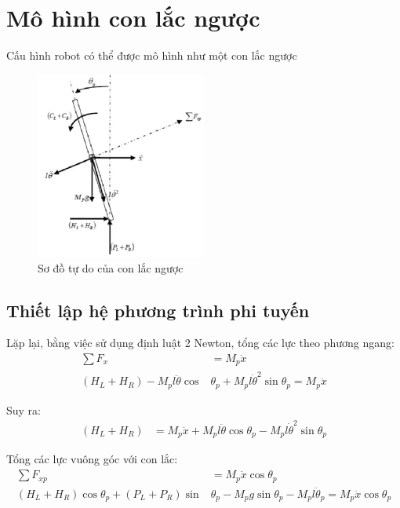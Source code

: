     \section{Mô hình con lắc ngược}
        \hspace*{0.6cm}Cấu hình robot có thể được mô hình như một con lắc ngược
            \begin{figure}[H]
                \centering
                \includegraphics[width=0.5\textwidth]{pictures/inverted_pendulum.png} 
                \caption{Sơ đồ tự do của con lắc ngược}
            \end{figure}
        \subsection{Thiết lập hệ phương trình phi tuyến}
            Lặp lại, bằng việc sử dụng định luật 2 Newton, tổng các lực theo phương ngang:
            \begin{align}
                \sum F_x &= M_p \ddot{x} \nonumber\\
                (H_L + H_R) - M_p l \ddot{\theta} \cos &\theta_p + M_p l \dot{\theta}^2 \sin \theta_p = M_p \ddot{x} 
            \end{align}
            
            Suy ra:
            \begin{align}
                (H_L + H_R) &= M_p \ddot{x} + M_p l \ddot{\theta} \cos \theta_p - M_p l \dot{\theta}^2 \sin \theta_p 
            \end{align}
            
            Tổng các lực vuông góc với con lắc:
            \begin{align}
                \sum F_{xp} &= M_p \ddot{x} \cos \theta_p \nonumber\\
                (H_L + H_R) \cos \theta_p + (P_L + P_R) \sin& \theta_p - M_p g \sin \theta_p - M_p l \ddot{\theta}_p = M_p \ddot{x} \cos \theta_p 
            \end{align}
            
